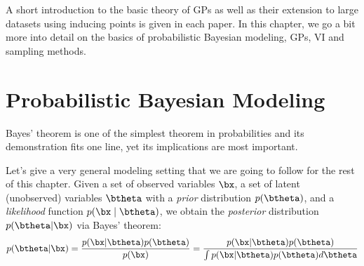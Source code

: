 


\graphicspath{{2/figures/}}

A short introduction to the basic theory of \acl{GPs} as well as their extension to large datasets using inducing points \cite{Titsias2009} is given in each paper.
In this chapter, we go a bit more into detail on the basics of probabilistic Bayesian modeling, \acl{GPs}, \acl{VI} and sampling methods.


\section{Probabilistic Bayesian Modeling}

\label{sec:prob_bayes}

Bayes' theorem is one of the simplest theorem in probabilities and its demonstration fits one line, yet its implications are most important.

Let's give a very general modeling setting that we are going to follow for the rest of this chapter.
Given a set of observed variables $\bx$, a set of latent (unobserved) variables $\btheta$ with a \textit{prior} distribution $p(\btheta)$, and a \textit{likelihood} function $p(\bx\mid\btheta)$, we obtain the \textit{posterior} distribution $p(\btheta|\bx)$ via Bayes' theorem:
\begin{align}
p(\btheta|\bx) = \frac{p(\bx|\btheta)p(\btheta)}{p(\bx)} = \frac{p(\bx|\btheta)p(\btheta)}{\int p(\bx|\btheta)p(\btheta)d\btheta}
\label{eq:bayes}
\end{align}

